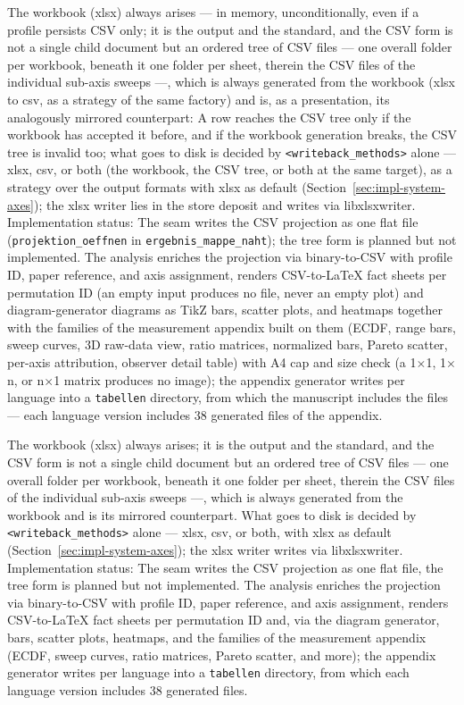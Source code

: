 \begin{nurlang}
The workbook (xlsx) always arises --- in memory, unconditionally, even if a profile persists CSV
only; it is the output and the standard, and the CSV form is not a single child document but an
ordered tree of CSV files --- one overall folder per workbook, beneath it one folder per sheet,
therein the CSV files of the individual sub-axis sweeps ---, which is always generated from the
workbook (xlsx to csv, as a strategy of the same factory) and is, as a presentation, its analogously
mirrored counterpart: A row reaches the CSV tree only if the workbook has accepted it before, and if
the workbook generation breaks, the CSV tree is invalid too; what goes to disk is decided by
\texttt{<writeback\_methods>} alone --- xlsx, csv, or both (the workbook, the CSV tree, or both at
the same target), as a strategy over the output formats with xlsx as default
(Section~\ref{sec:impl-system-axes}); the xlsx writer lies in the store deposit and writes via
libxlsxwriter. Implementation status: The seam writes the CSV projection as one flat file
(\texttt{projektion\_\allowbreak{}oeffnen} in
\texttt{ergebnis\_\allowbreak{}mappe\_\allowbreak{}naht}); the tree form is planned but not
implemented. The analysis enriches the projection via binary-to-CSV with profile ID, paper reference,
and axis assignment, renders CSV-to-LaTeX fact sheets per permutation ID (an empty input produces no
file, never an empty plot) and diagram-generator diagrams as TikZ bars, scatter plots, and heatmaps
together with the families of the measurement appendix built on them (ECDF, range bars, sweep
curves, 3D raw-data view, ratio matrices, normalized bars, Pareto scatter, per-axis attribution,
observer detail table) with A4 cap and size check (a 1$\times$1, 1$\times$n, or n$\times$1 matrix
produces no image); the appendix generator writes per language into a \texttt{tabellen} directory,
from which the manuscript includes the files --- each language version includes 38 generated files of
the appendix.
\end{nurlang}
\begin{nurkurz}
The workbook (xlsx) always arises; it is the output and the standard, and the CSV form is not a single child
document but an ordered tree of CSV files --- one overall folder per workbook, beneath it one folder per
sheet, therein the CSV files of the individual sub-axis sweeps ---, which is always generated from the
workbook and is its mirrored counterpart. What goes to disk is decided by \texttt{<writeback\_methods>}
alone --- xlsx, csv, or both, with xlsx as default (Section~\ref{sec:impl-system-axes}); the xlsx writer
writes via libxlsxwriter. Implementation status: The seam writes the CSV projection as one flat file, the
tree form is planned but not implemented. The analysis enriches the projection via binary-to-CSV with
profile ID, paper reference, and axis assignment, renders CSV-to-LaTeX fact sheets per permutation ID and,
via the diagram generator, bars, scatter plots, heatmaps, and the families of the measurement appendix
(ECDF, sweep curves, ratio matrices, Pareto scatter, and more); the appendix generator writes per language
into a \texttt{tabellen} directory, from which each language version includes 38 generated files.
\end{nurkurz}

